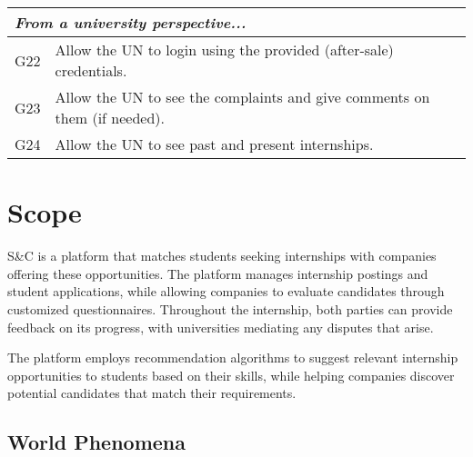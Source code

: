 \begin{longtable}{|l|p{}|}
    \hline \hline
    \multicolumn{2}{|l|}{\textit{From a university perspective...}}                                                                                                   \\
    \hline
    G22           & Allow the UN to login using the provided (after-sale) credentials.                                                                                \\
    \hline
    G23           & Allow the UN to see the complaints and give comments on them (if needed).                                                                         \\
    \hline
    G24           & Allow the UN to see past and present internships.                                                                                                 \\
    \hline
\end{longtable}

\section{Scope}
\label{sec:scope}%

\par S\&C is a platform that matches students seeking internships with companies offering these opportunities. The
platform manages internship postings and student applications, while allowing companies to evaluate candidates through
customized questionnaires. Throughout the internship, both parties can provide feedback on its progress, with
universities mediating any disputes that arise.

\par The platform employs recommendation algorithms to suggest relevant internship opportunities to students based on
their skills, while helping companies discover potential candidates that match their requirements.

\pagebreak

\subsection{World Phenomena}
\label{subsec:world-phenomena}%

